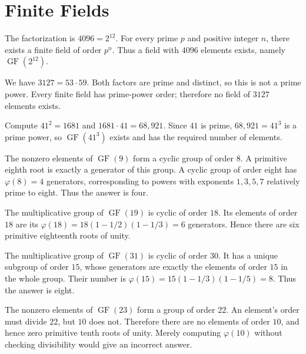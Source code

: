 \section{Finite Fields}

The factorization is $4096=2^{12}$. For every prime $p$ and positive integer $n$, there exists a finite field of order $p^n$. Thus a field with $4096$ elements exists, namely $\operatorname{GF}(2^{12})$.

We have $3127=53\cdot59$. Both factors are prime and distinct, so this is not a prime power. Every finite field has prime-power order; therefore no field of $3127$ elements exists.

Compute $41^2=1681$ and $1681\cdot41=68{,}921$. Since $41$ is prime, $68{,}921=41^3$ is a prime power, so $\operatorname{GF}(41^3)$ exists and has the required number of elements.

The nonzero elements of $\operatorname{GF}(9)$ form a cyclic group of order $8$. A primitive eighth root is exactly a generator of this group. A cyclic group of order eight has $\varphi(8)=4$ generators, corresponding to powers with exponents $1,3,5,7$ relatively prime to eight. Thus the answer is four.

The multiplicative group of $\operatorname{GF}(19)$ is cyclic of order $18$. Its elements of order $18$ are its $\varphi(18)=18(1-1/2)(1-1/3)=6$ generators. Hence there are six primitive eighteenth roots of unity.

The multiplicative group of $\operatorname{GF}(31)$ is cyclic of order $30$. It has a unique subgroup of order $15$, whose generators are exactly the elements of order $15$ in the whole group. Their number is $\varphi(15)=15(1-1/3)(1-1/5)=8$. Thus the answer is eight.

The nonzero elements of $\operatorname{GF}(23)$ form a group of order $22$. An element's order must divide $22$, but $10$ does not. Therefore there are no elements of order $10$, and hence zero primitive tenth roots of unity. Merely computing $\varphi(10)$ without checking divisibility would give an incorrect answer.

